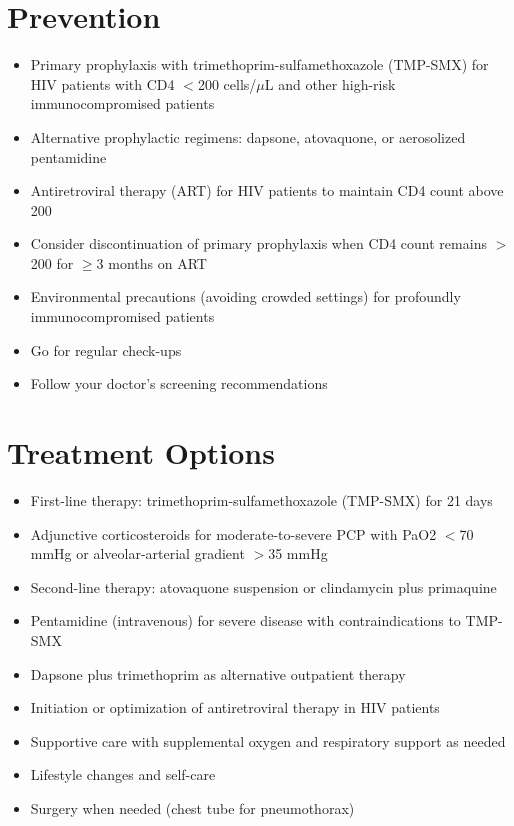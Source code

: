 \section{Prevention}

\begin{itemize}[noitemsep]
  \item Primary prophylaxis with trimethoprim-sulfamethoxazole (TMP-SMX) for HIV patients with CD4 $<$200 cells/$\mu$L and other high-risk immunocompromised patients
  \item Alternative prophylactic regimens: dapsone, atovaquone, or aerosolized pentamidine
  \item Antiretroviral therapy (ART) for HIV patients to maintain CD4 count above 200
  \item Consider discontinuation of primary prophylaxis when CD4 count remains $>$200 for $\ge$3 months on ART
  \item Environmental precautions (avoiding crowded settings) for profoundly immunocompromised patients
  \item Go for regular check-ups
  \item Follow your doctor's screening recommendations
\end{itemize}

\section{Treatment Options}

\begin{itemize}[noitemsep]
  \item First-line therapy: trimethoprim-sulfamethoxazole (TMP-SMX) for 21 days
  \item Adjunctive corticosteroids for moderate-to-severe PCP with PaO2 $<$70 mmHg or alveolar-arterial gradient $>$35 mmHg
  \item Second-line therapy: atovaquone suspension or clindamycin plus primaquine
  \item Pentamidine (intravenous) for severe disease with contraindications to TMP-SMX
  \item Dapsone plus trimethoprim as alternative outpatient therapy
  \item Initiation or optimization of antiretroviral therapy in HIV patients
  \item Supportive care with supplemental oxygen and respiratory support as needed
  \item Lifestyle changes and self-care
  \item Surgery when needed (chest tube for pneumothorax)
\end{itemize}

